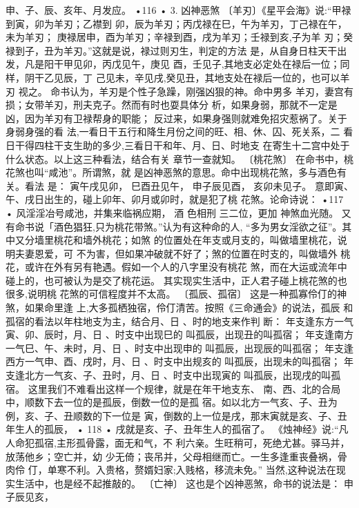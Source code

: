申、子、辰、亥年、月发应。
•116 •
3. 凶神恶煞
〔羊刃〕《星平会海》说:“甲禄到寅，卯为羊刃；乙襟到
卯，辰为羊刃；丙戊禄在巳，午为羊刃，丁己禄在午，未为羊刃；
庚禄居申，酉为羊刃；辛禄到酉，戌为羊刃；壬禄到亥,子为羊
刃；癸禄到子，丑为羊刃。”这就是说，禄过则刃生，判定的方法
是，从自身日柱天干出发，凡是阳干甲见卯，丙戊见午，庚见
酉，壬见子,其地支必定处在禄后一位；同样，阴干乙见辰，丁
己见未，辛见戌,癸见丑，其地支处在禄后一位的，也可以羊刃
视之。
命书认为，羊刃是个性子急躁，刚强凶狠的神。命中男多
羊刃，妻宫有损；女带羊刃，刑夫克子。然而有时也耍具体分
析，如果身弱，那就不一定是凶，因为羊刃有卫禄帮身的职能；
反过来，如果身强则就难免招灾惹祸了。关于身弱身强的看
法,一看日干五行和降生月份之间的旺、相、休、囚、死关系，二
看日干得四柱干支生助的多少,三看日干和年、月、日、时地支
在寄生十二宫中处于什么状态。以上这三种看法，结合有关
章节一查就知。
〔桃花煞〕 在命书中，桃花煞也叫“咸池”。所谓煞，就
是凶神恶煞的意思。命中出现桃花煞，多与酒色有关。看法
是：
寅午戌见卯，
巳酉丑见午，
申子辰见酉，
亥卯未见子。
意即寅、午、戌日出生的，碰上卯年、卯月或卯时，就是犯了桃
花煞。论命诗说：
•117 •
风淫淫冶号咸池，并集来临祸应期，
酒 色相刑 三二位，更加 神煞血光随。
又有命书说「酒色猖狂,只为桃花带煞。”认为有这种命的人,
“多为男女淫欲之征”。其中又分墙里桃花和墙外桃花；如煞
的位置处在年支或月支的，叫做墙里桃花，说明夫妻恩爱，可
不为害，但如果冲破就不好了；煞的位置在时支的，叫做墙外
桃花，或许在外有另有艳遇。假如一个人的八字里没有桃花
煞，而在大运或流年中碰上的，也可被认为是交了桃花运。
其实现实生活中，正人君子碰上桃花煞的也很多,说明桃
花煞的可信程度并不太高。
〔孤辰、孤宿〕 这是一种孤寡伶仃的神煞，如果命里逢
上,大多孤栖独宿，伶仃清苦。按照《三命通会》的说法，孤辰
和孤宿的看法以年柱地支为主，结合月、日 、时的地支来作判
断：
年支逢东方一气寅、卯、辰时，月、日 、时支中出现巳的
叫孤辰，出现丑的叫孤宿；
年支逢南方一气巳、午、未时，月、日 、时支中出现申的
叫孤辰，出现辰的叫孤宿；
年支逢西方一气申、酉、戌时，月、日 、时支中出规亥的
叫孤辰，出现未的叫孤宿；
年支逢北方一气亥、子、丑时，月、日 、时支中出现寅的
叫孤辰，出现戌的叫孤宿。
这里我们不难看出这样一个规律，就是在年干地支东、
南、西、北的合局中，顺数下去一位的是孤辰，倒数一位的是孤
宿。如以北方一气亥、子、丑为例，亥、子、丑顺数的下一位是
寅，倒数的上一位是戌，那末寅就是亥、子、丑年生人的孤辰，
• 118 •
戌就是亥、子、丑年生人的孤宿了。
《烛神经》说:“凡人命犯孤宿,主形孤骨露，面无和气，不
利六亲。生旺稍可，死绝尤甚。驿马并，放荡他乡；空亡并，幼
少无倚；丧吊并，父母相继而亡。一生多逢重丧叠祸，骨肉伶
仃，单寒不利。入贵格，赘婿妇家;入贱格，移流未免。”
当然,这种说法在现实生活中，也是经不起推敲的。
〔亡神〕 这也是个凶神恶煞，命书的说法是：
申子辰见亥，
